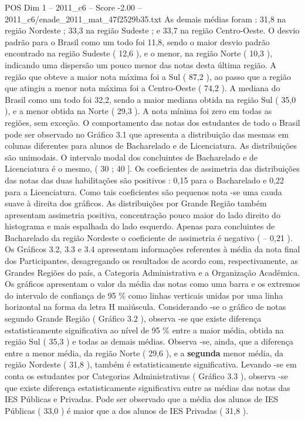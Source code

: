 \begin{textsample}{POS Dim 1 – 2011\_c6 – Score -2.00 – 2011\_c6/enade\_2011\_mat\_47f2529b35.txt}
As demais médias foram : 31,8 na região Nordeste ; 33,3 na região Sudeste ; e 33,7 na região Centro-Oeste.
O desvio padrão para o Brasil como um todo foi 11,8, sendo o maior desvio padrão encontrado na região Sudeste ( 12,6 ), e o menor, na região Norte ( 10,3 ), indicando uma dispersão um pouco menor das notas desta última região.
A região que obteve a maior nota máxima foi a Sul ( 87,2 ), ao passo que a região que atingiu a menor nota máxima foi a Centro-Oeste ( 74,2 ).
A mediana do Brasil como um todo foi 32,2, sendo a maior mediana obtida na região Sul ( 35,0 ), e a menor obtida na Norte ( 29,3 ).
A nota mínima foi zero em todas as regiões, sem exceção.
O comportamento das notas dos estudantes de todo o Brasil pode ser observado no Gráfico 3.1 que apresenta a distribuição das mesmas em colunas diferentes para alunos de Bacharelado e de Licenciatura.
As distribuições são unimodais.
O intervalo modal dos concluintes de Bacharelado e de Licenciatura é o mesmo, ( 30 ; 40 ].
Os coeficientes de assimetria das distribuições das notas das duas habilitações são positivos : 0,15 para o Bacharelado e 0,22 para a Licenciatura.
Como tais coeficientes são pequenos nota -se uma cauda suave à direita dos gráficos.
As distribuições por Grande Região também apresentam assimetria positiva, concentração pouco maior do lado direito do histograma e mais espalhada do lado esquerdo.
Apenas para concluintes de Bacharelado da região Nordeste o coeficiente de assimetria é negativo ( – 0,21 ).
Os Gráficos 3.2, 3.3 e 3.4 apresentam informações referentes à média da nota final dos Participantes, desagregando os resultados de acordo com, respectivamente, as Grandes Regiões do país, a Categoria Administrativa e a Organização Acadêmica.
Os gráficos apresentam o valor da média das notas como uma barra e os extremos do intervalo de confiança de 95 \% como linhas verticais unidas por uma linha horizontal na forma da letra H maiúscula.
Considerando -se o gráfico de notas segundo Grande Região ( Gráfico 3.2 ), observa -se que existe diferença estatisticamente significativa ao nível de 95 \% entre a maior média, obtida na região Sul ( 35,3 ) e todas as demais médias.
Observa -se, ainda, que a diferença entre a menor média, da região Norte ( 29,6 ), e a \textbf{segunda} menor média, da região Nordeste ( 31,8 ), também é estatisticamente significativa.
Levando -se em conta os estudantes por Categorias Administrativas ( Gráfico 3.3 ), observa -se que existe diferença estatisticamente significativa entre as médias das notas das IES Públicas e Privadas.
Pode ser observado que a média dos alunos de IES Públicas ( 33,0 ) é maior que a dos alunos de IES Privadas ( 31,8 ).

\end{textsample}
